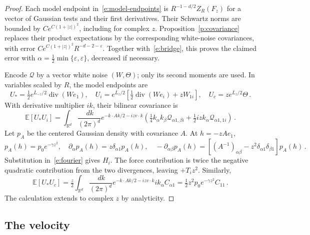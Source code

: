 \documentclass[11pt]{amsart}
\theoremstyle{definition}
\theoremstyle{remark}
\numberwithin{equation}{section}
\newcommand{\E}{\mathbb E}
\newcommand{\R}{\mathbb R}
\renewcommand{\epsilon}{\varepsilon}
\newcommand{\dd}{\,d}
\newcommand{\diver}{\operatorname{div}}
\begin{document}
\begin{proof}
Each model endpoint in~\eqref{e:model-endpoints} is $R^{-1-d/2}Z_R(F_z)$ for a vector of Gaussian tests and their first derivatives. Their Schwartz norms are bounded by $Ce^{C(1+|z|)^2}$, including for complex $z$. Proposition~\ref{p:covariance} replaces their product expectations by the corresponding white-noise covariances, with error $Ce^{C(1+|z|)^2}R^{-d-2-\varepsilon}$. Together with~\eqref{e:bridge}, this proves the claimed error with $\alpha=\tfrac12\min\{\epsilon,\varepsilon\}$, decreased if necessary.

Encode $\mathcal Q$ by a vector white noise $(W,\Theta)$; only its second moments are used. In variables scaled by $R$, the model endpoints are
\begin{equation*}
 U_*=\tfrac12e^{\overline L_{-z}/2}\diver(We_1),\quad
 U_i=e^{\overline L_z/2}
       [\tfrac12\diver(We_i)+zW_{1i}],\quad
 U_c=ze^{\overline L_z/2}\Theta\, .
\end{equation*}
With derivative multiplier $ik$, their bilinear covariance is
\begin{equation}\label{e:fourier}
 \E[U_*U_i]=\int_{\R^d}\frac{\dd k}{(2\pi)^d}
 e^{-k\cdot Ak/2-izv\cdot k}
 \left(\tfrac14k_\alpha k_\beta\mathscr Q_{\alpha1,\beta i}
       +\tfrac12izk_\alpha\mathscr Q_{\alpha1,1i}\right)\, .
\end{equation}
Let $p_A$ be the centered Gaussian density with covariance $A$. At $h=-zAe_1$,
\begin{equation*}
 p_A(h)=p_0e^{-\gamma z^2},\quad
 \partial_\alpha p_A(h)=z\delta_{\alpha1}p_A(h),\quad
 -\partial_{\alpha\beta}p_A(h)
 =[(A^{-1})_{\alpha\beta}-z^2\delta_{\alpha1}\delta_{\beta1}]p_A(h)\, .
\end{equation*}
Substitution in~\eqref{e:fourier} gives $H_i$. The force contribution is twice the negative quadratic contribution from the two divergences, leaving $+T_i z^2$. Similarly,
\begin{equation*}
 \E[U_*U_c]=\tfrac z2\int_{\R^d}\frac{\dd k}{(2\pi)^d}
   e^{-k\cdot Ak/2-izv\cdot k}ik_\alpha C_{\alpha1}
 =\tfrac12 z^2p_0e^{-\gamma z^2}C_{11}\, .
\end{equation*}
The calculation extends to complex $z$ by analyticity.
\end{proof}


\subsection{The velocity}\label{ss.velocity}
\end{document}
